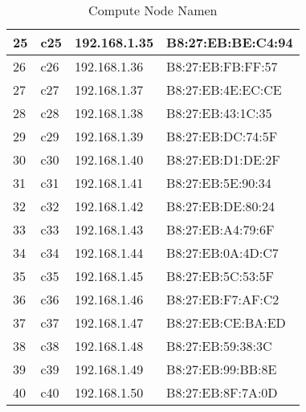 \begin{table}[H]
\begin{tabular}{p{1cm}p{2cm}p{6cm}p{6cm}}
25 & c25 & 192.168.1.35 & B8:27:EB:BE:C4:94\\\hline
26 & c26 & 192.168.1.36 & B8:27:EB:FB:FF:57\\\hline
27 & c27 & 192.168.1.37 & B8:27:EB:4E:EC:CE\\\hline
28 & c28 & 192.168.1.38 & B8:27:EB:43:1C:35\\\hline
29 & c29 & 192.168.1.39 & B8:27:EB:DC:74:5F\\\hline
30 & c30 & 192.168.1.40 & B8:27:EB:D1:DE:2F\\\hline
31 & c31 & 192.168.1.41 & B8:27:EB:5E:90:34\\\hline
32 & c32 & 192.168.1.42 & B8:27:EB:DE:80:24\\\hline
33 & c33 & 192.168.1.43 & B8:27:EB:A4:79:6F\\\hline
34 & c34 & 192.168.1.44 & B8:27:EB:0A:4D:C7\\\hline
35 & c35 & 192.168.1.45 & B8:27:EB:5C:53:5F\\\hline
36 & c36 & 192.168.1.46 & B8:27:EB:F7:AF:C2\\\hline
37 & c37 & 192.168.1.47 & B8:27:EB:CE:BA:ED\\\hline
38 & c38 & 192.168.1.48 & B8:27:EB:59:38:3C\\\hline
39 & c39 & 192.168.1.49 & B8:27:EB:99:BB:8E\\\hline
40 & c40 & 192.168.1.50 & B8:27:EB:8F:7A:0D\\\hline
\end{tabular}
\caption{Compute Node Namen}
\end{table}
